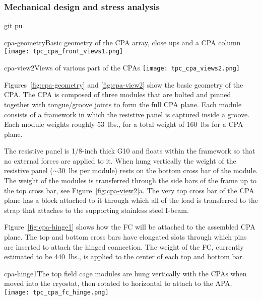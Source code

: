 \subsubsection{Mechanical design and stress analysis}
git pu 

\begin{cdrfigure}{cpa-geometry}{Basic geometry of the CPA array, close ups and a CPA column} 
\texttt{[image: tpc\_cpa\_front\_views1.png]}
\end{cdrfigure}

\begin{cdrfigure}{cpa-view2}{Views of various part of the CPAs} 
\texttt{[image: tpc\_cpa\_views2.png]}
\end{cdrfigure}


Figures~\ref{fig:cpa-geometry} and \ref{fig:cpa-view2} show the basic geometry of the CPA.  The CPA is composed of three modules that are bolted and pinned together with tongue/groove joints to form the full CPA plane.  Each module consists of a framework in which the resistive panel is captured inside a groove.  Each module weights roughly 53~lbs., for a total weight of 160~lbs for a CPA plane.  

The resistive panel is 1/8-inch thick G10 and floats within the framework so that no external forces are applied to it.  When hung vertically the weight of the resistive panel ($\sim$30~lbs per module) rests on the bottom cross bar of the module.  The weight of the modules is transferred through the side bars of the frame  up to the top cross bar, see Figure~\ref{fig:cpa-view2}a.  The very top cross bar of the CPA plane has a block attached to it through which all of the load is transferred to the strap that attaches to the supporting stainless steel I-beam.  

Figure~\ref{fig:cpa-hinge1} shows how the FC will be attached to the assembled CPA plane.  The top and bottom cross bars have elongated slots through which pins are inserted to attach the hinged connection.  The weight of the FC, currently estimated to be 440~lbs., is applied to the center of each top and bottom bar.  

\begin{cdrfigure}{cpa-hinge1}{The top field cage modules are hung vertically with the CPAs when moved into the cryostat, then rotated to horizontal to attach to the APA.} 
\texttt{[image: tpc\_cpa\_fc\_hinge.png]}
\end{cdrfigure}


